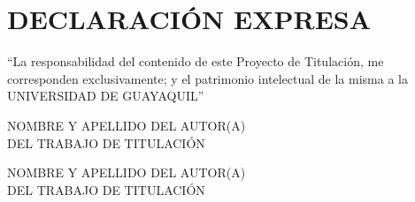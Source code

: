 \documentclass[12pt, a4paper, nofontenc, numbers=endperiod]{apa7}
\begin{document}
	{ %
		
		\section*{\large \centering DECLARACIÓN EXPRESA}	
		
		\vspace*{5cm}
		\begin{flushright}
			\begin{minipage}[b]{10cm}		
				“La responsabilidad del contenido de este Proyecto de Titulación, me corresponden exclusivamente; y el patrimonio intelectual de la misma a la UNIVERSIDAD DE GUAYAQUIL” 
			\end{minipage}	
		\end{flushright}
		\vspace*{3cm}
		
		
		\begin{flushright}
			\begin{minipage}[b]{10cm}
				\centering\singlespacing		
				NOMBRE Y APELLIDO DEL AUTOR(A) \\ DEL TRABAJO DE TITULACIÓN		
			\end{minipage}	
		\end{flushright}
		\vspace*{1cm}
		
		\begin{flushright}
			\begin{minipage}[b]{10cm}
				\centering\singlespacing		
				{\color{red}NOMBRE Y APELLIDO DEL AUTOR(A) \\ DEL TRABAJO DE TITULACIÓN}		
			\end{minipage}	
		\end{flushright}
	}
	\newpage
\end{document}
